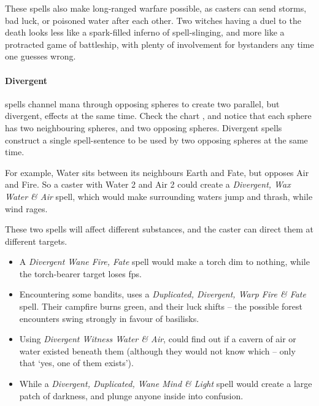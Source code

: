 \begin{multicols}{2}
\begin{exampletext}
  These spells also make long-ranged warfare possible, as casters can send storms, bad luck, or poisoned water after each other.
  Two witches having a duel to the death looks less like a spark-filled inferno of spell-slinging, and more like a protracted game of battleship, with plenty of involvement for bystanders any time one guesses wrong.
\end{exampletext}

\begin{figure*}[t!]
  \centering
  \speltogram
  \label{speltogram}
\end{figure*}

\paragraph{Divergent}
spells channel mana through opposing \glspl{sphere} to create two parallel, but divergent, effects at the same time.
Check the chart , and notice that each \gls{sphere} has two neighbouring \glspl{sphere}, and two opposing \glspl{sphere}.
Divergent spells construct a single spell-sentence to be used by two opposing \glspl{sphere} at the same time.

For example, Water sits between its neighbours Earth and Fate, but opposes Air and Fire.
So a caster with Water 2 and Air 2 could create a \textit{Divergent, Wax Water \& Air} spell, which would make surrounding waters jump and thrash, while wind rages.

These two spells will affect different substances, and the caster can direct them at different targets.

\begin{itemize}
  \item
  A \textit{Divergent Wane Fire, Fate} spell would make a torch dim to nothing, while the torch-bearer target loses \glspl{fp}.
  \item
  Encountering some bandits,  uses a \textit{Duplicated, Divergent, Warp Fire \& Fate} spell.
  Their campfire burns green, and their luck shifts -- the possible forest encounters swing strongly in favour of basilisks.
  \item
  Using \textit{Divergent Witness Water \& Air},  could find out if a cavern of air or water existed beneath them (although they would not know which -- only that `yes, one of them exists').
  \item
  While a \textit{Divergent, Duplicated, Wane Mind \& Light} spell would create a large patch of darkness, and plunge anyone inside into confusion.
\end{itemize}


\end{multicols}
